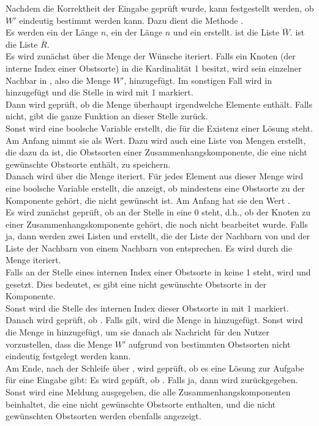 Nachdem die Korrektheit der Eingabe geprüft wurde, kann festgestellt werden, ob $W'$ eindeutig
bestimmt werden kann. Dazu dient die Methode .\\
Es werden ein  der Länge $n$, ein  der Länge $n$ und 
ein  erstellt.
 ist die Liste $\bar{W}$.  ist die Liste $\bar{R}$.\\
Es wird zunächst über die Menge der Wünsche  iteriert. 
Falls ein Knoten  (der interne Index einer Obstsorte) in 
die Kardinalität 1 besitzt, wird sein einzelner
Nachbar in , also die Menge $W'$, hinzugefügt.
Im sonstigen Fall wird  in  hinzugefügt und die Stelle  in 
wird mit 1 markiert.\\
Dann wird geprüft, ob die Menge  überhaupt irgendwelche Elemente enthält.
Falls nicht, gibt die ganze Funktion an dieser Stelle  zurück.\\
Sonst wird eine boolsche Variable  erstellt, die für die Existenz einer Lösung steht.
Am Anfang nimmt sie  als Wert. 
Dazu wird auch eine Liste von Mengen  erstellt, die dazu da ist,
die Obstsorten einer Zusammenhangskomponente, die eine nicht gewünschte Obstsorte enthält, zu speichern.\\
Danach wird über die Menge  iteriert. 
Für jedes Element  aus dieser Menge wird eine boolsche Variable  erstellt, die 
anzeigt, ob mindestens eine Obstsorte zu der Komponente gehört, die nicht gewünscht ist.
Am Anfang hat sie den Wert .\\
Es wird zunächst geprüft, ob an der Stelle  in  eine 0 steht, d.h.,
ob der Knoten zu einer Zusammenhangskomponente gehört, die noch nicht bearbeitet wurde.
Falls ja, dann werden zwei Listen  und  erstellt,
die der Liste der Nachbarn von  und der Liste der Nachbarn von einem Nachbarn von 
entsprechen.
Es wird durch die Menge  iteriert.\\
Falls an der Stelle eines internen Index
einer Obstsorte in  keine 1 steht, wird  und  gesetzt.
Dies bedeutet, es gibt eine nicht gewünschte Obstsorte in der Komponente.\\
Sonst wird die Stelle des internen Index dieser Obstsorte in  mit 1 markiert.\\
Danach wird geprüft, ob . Falls  gilt, wird die Menge 
in  hinzugefügt. Sonst wird die Menge  in  hinzugefügt, um sie 
danach als Nachricht für den Nutzer vorzustellen, dass 
die Menge $W'$ aufgrund von bestimmten Obstsorten nicht eindeutig festgelegt werden kann.\\
Am Ende, nach der Schleife über , wird geprüft, ob es eine Lösung zur Aufgabe für eine
Eingabe gibt: Es wird gepüft, ob . Falls ja, dann wird  zurückgegeben.
Sonst wird eine Meldung ausgegeben, die alle Zusammenhangskomponenten beinhaltet, 
die eine nicht gewünschte Obstsorte enthalten, und die nicht gewünschten Obstsorten werden
ebenfalls angezeigt.
